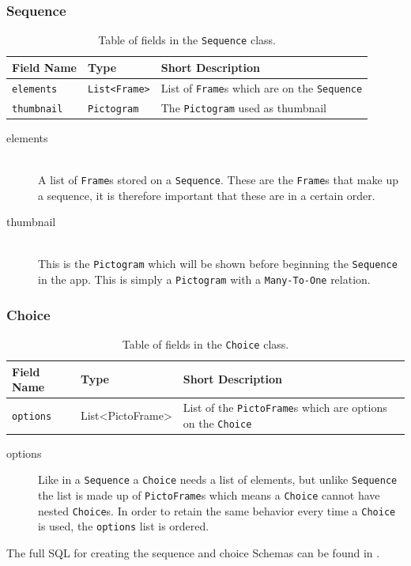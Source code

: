 \subsubsection{Sequence}
\begin{table}[H]
    \footnotesize
    \centering
    \begin{tabularx}{\textwidth}{ l X X }
        Field Name    & Type                                & Short Description                                \\
        \midrule
        \texttt{elements}        & \texttt{List\textless Frame\textgreater} & List of \texttt{Frame}s which are on the \texttt{Sequence} \\
        \texttt{thumbnail}        & \texttt{Pictogram}       & The \texttt{Pictogram} used as thumbnail\\
    \end{tabularx}
    \caption{Table of fields in the \texttt{Sequence} class.}
    \label{tbl:sequence_class}
\end{table}
\begin{description}
	\item[elements] \hfill \\
    A list of \texttt{Frame}s stored on a \texttt{Sequence}.
	These are the \texttt{Frame}s that make up a sequence, it is therefore important that these are in a certain order.
	\item[thumbnail] \hfill \\
    This is the \texttt{Pictogram} which will be shown before beginning the \texttt{Sequence} in the app.
	This is simply a \texttt{Pictogram} with a \texttt{Many-To-One} relation.
\end{description}

\subsubsection{Choice}
\begin{table}[H]
    \footnotesize
    \centering
    \begin{tabularx}{\textwidth}{ l X X }
        Field Name    & Type                                & Short Description                                \\
        \midrule
        \texttt{options}  & List<PictoFrame>      & List of the \texttt{PictoFrame}s which are options on the \texttt{Choice}\\
    \end{tabularx}
    \caption{Table of fields in the \texttt{Choice} class.}
    \label{tbl:choice_class}
\end{table}
\begin{description}
	\item[options] Like in a \texttt{Sequence} a \texttt{Choice} needs a list of elements, but unlike \texttt{Sequence} the list is made up of \texttt{PictoFrame}s which means a \texttt{Choice} cannot have nested \texttt{Choice}s.
    In order to retain the same behavior every time a \texttt{Choice} is used, the \texttt{options} list is ordered.
\end{description}
\bigskip
The full SQL for creating the sequence and choice Schemas can be found in .

